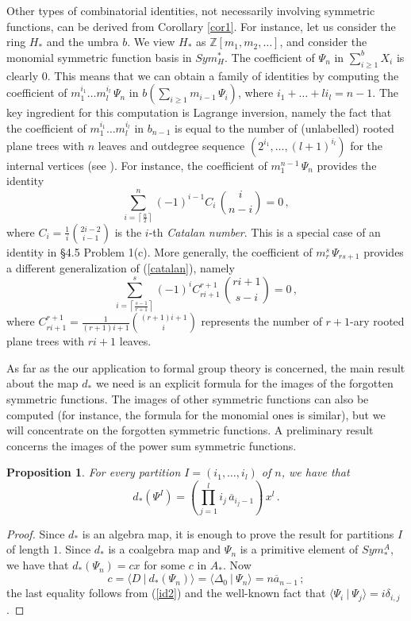 \documentclass[a4paper,12pt]{amsart}
\newtheorem{prop}[equation]{Proposition}
\theoremstyle{definition}
\numberwithin{equation}{section}
\newcommand{\bZ}{{\mathbb Z}}
\newcommand{\hp}{\mbox{$H_\ast$}}
\newcommand{\br}[1]{\langle#1\rangle}
\newcommand{\dual}[2]{\br{#1 \:|\: #2}}
\newcommand{\sua}{Sym_*^A }
\newcommand{\bbb}{m}
\begin{document}
Other types of combinatorial identities, not necessarily involving
symmetric functions, can be derived from Corollary \ref{cor1}. For
instance, let us consider the ring $\hp$ and the umbra $b$. We view
$\hp$ as $\bZ[\bbb_1,\bbb_2,\ldots]$, and consider the monomial
symmetric function basis in $Sym_H^*$. The coefficient of $\varPsi_n$
in $\sum_{i\ge 1}^b X_i$ is clearly $0$. This means that we can
obtain a family of identities by computing the coefficient of
$\bbb_1^{i_1}\ldots\bbb_l^{i_l}\,\varPsi_n$ in $b(\sum_{i\ge
1}\bbb_{i-1}\,\varPsi_i)$, where $i_1+\ldots+l i_l=n-1$. The key
ingredient for this computation is Lagrange inversion, namely the fact
that the coefficient of $\bbb_1^{i_1}\ldots\bbb_l^{i_l}$ in $b_{n-1}$
is equal to the number of (unlabelled) rooted plane trees with $n$
leaves and outdegree sequence $(2^{i_1},\ldots,(l+1)^{i_l})$ for the
internal vertices (see \cite{gajce}). For instance, the coefficient of
$\bbb_1^{n-1}\,\varPsi_n$ provides the identity
\begin{equation}\label{catalan}
\sum_{i=\left\lceil
\frac{n}{2}\right\rceil}^n (-1)^{i-1}C_i\,\binom{i}{n-i}=0\,,
\end{equation}
where $C_i=\frac{1}{i}\binom{2i-2}{i-1}$ is the $i$-th {\em Catalan
number}. This is a special case of an identity in \cite{rioci} \S4.5 Problem 1(c). More generally, the coefficient of $\bbb_r^s\,\varPsi_{rs+1}$
provides a different generalization of (\ref{catalan}), namely
\begin{equation}
 \sum_{i=\left\lceil\frac{s-1}{r+1}\right\rceil}^s
(-1)^i C_{ri+1}^{r+1}\,\binom{ri+1}{s-i}=0\,,
\end{equation}
where $C_{ri+1}^{r+1}=\frac{1}{(r+1)i+1}\binom{(r+1)i+1}{i}$
represents the number of $r+1$-ary rooted plane trees with $ri+1$ leaves.

As far as the our application to formal group theory is concerned, the main result about the map $d_*$ we need is an explicit formula for the images of the forgotten symmetric functions. The images of other symmetric functions can also be computed (for instance, the formula for the monomial ones is similar), but we will concentrate on the forgotten symmetric functions. A preliminary result concerns the images of the power sum symmetric functions. 

\begin{prop}\label{impower}
For every partition $I=(i_1,\ldots,i_l)$ of $n$, we have that
\[ d_*(\varPsi^I)=\left(\prod_{j=1}^l i_j\,\overline{a}_{i_j-1}\right)\,x^l\,.\]
\end{prop}
\begin{proof} Since $d_*$ is an algebra map, it is enough to prove the result for partitions $I$ of length $1$. Since $d_*$ is a coalgebra map and $\varPsi_n$ is a primitive element of $\sua$, we have that $d_*(\varPsi_n)=c x$ for some $c$ in $A_*$. Now
\[ c=\dual{D}{d_*(\varPsi_n)}=\dual{\varDelta_0}{\varPsi_n}=n \overline{a}_{n-1}\,;\]
the last equality follows from (\ref{id2}) and the well-known fact that $\dual{\varPsi_i}{\varPsi_j}=i \delta_{i,j}$. 
\end{proof}
\end{document}
